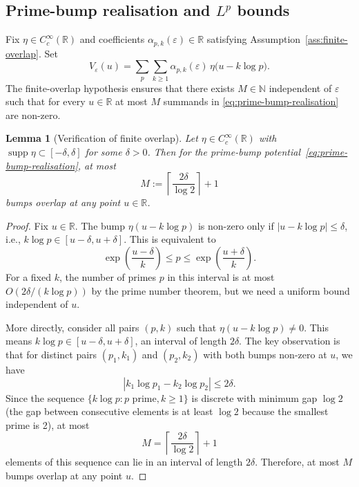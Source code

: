 ﻿\documentclass[12pt,a4paper]{article}
\newtheorem{lemma}[theorem]{Lemma}
\theoremstyle{definition}
\theoremstyle{remark}
\newcommand{\RR}{\mathbb{R}}
\newcommand{\NN}{\mathbb{N}}
\newcommand{\supp}{\operatorname{supp}}
\begin{document}
\subsection{Prime-bump realisation and $L^p$ bounds}
\label{subsec:prime-bump-Lp}
Fix $\eta\in C_c^\infty(\RR)$ and coefficients $\alpha_{p,k}(\varepsilon)\in\RR$ satisfying Assumption~\ref{ass:finite-overlap}.  Set
\begin{equation}\label{eq:prime-bump-realisation}
  V_\varepsilon(u)=\sum_{p}\sum_{k\ge1}\alpha_{p,k}(\varepsilon)\,\eta\bigl(u-k\log p\bigr).
\end{equation}
The finite-overlap hypothesis ensures that there exists $M\in\NN$ independent of $\varepsilon$ such that for every $u\in\RR$ at most $M$ summands in \eqref{eq:prime-bump-realisation} are non-zero.

\begin{lemma}[Verification of finite overlap]\label{lem:finite-overlap-verification}
Let $\eta \in C_c^\infty(\RR)$ with $\supp \eta \subset [-\delta, \delta]$ for some $\delta > 0$. Then for the prime-bump potential~\eqref{eq:prime-bump-realisation}, at most
\[
  M := \left\lceil \frac{2\delta}{\log 2} \right\rceil + 1
\]
bumps overlap at any point $u \in \RR$.
\end{lemma}

\begin{proof}
Fix $u \in \RR$. The bump $\eta(u - k \log p)$ is non-zero only if $|u - k \log p| \leq \delta$, i.e., $k \log p \in [u - \delta, u + \delta]$. This is equivalent to
\[
  \exp\left(\frac{u - \delta}{k}\right) \leq p \leq \exp\left(\frac{u + \delta}{k}\right).
\]
For a fixed $k$, the number of primes $p$ in this interval is at most $O(2\delta / (k \log p))$ by the prime number theorem, but we need a uniform bound independent of $u$.

More directly, consider all pairs $(p, k)$ such that $\eta(u - k \log p) \neq 0$. This means $k \log p \in [u - \delta, u + \delta]$, an interval of length $2\delta$. The key observation is that for distinct pairs $(p_1, k_1)$ and $(p_2, k_2)$ with both bumps non-zero at $u$, we have
\[
  |k_1 \log p_1 - k_2 \log p_2| \leq 2\delta.
\]
Since the sequence $\{k \log p : p \text{ prime}, k \geq 1\}$ is discrete with minimum gap $\log 2$ (the gap between consecutive elements is at least $\log 2$ because the smallest prime is 2), at most
\[
  M = \left\lceil \frac{2\delta}{\log 2} \right\rceil + 1
\]
elements of this sequence can lie in an interval of length $2\delta$. Therefore, at most $M$ bumps overlap at any point $u$.
\end{proof}
\end{document}
